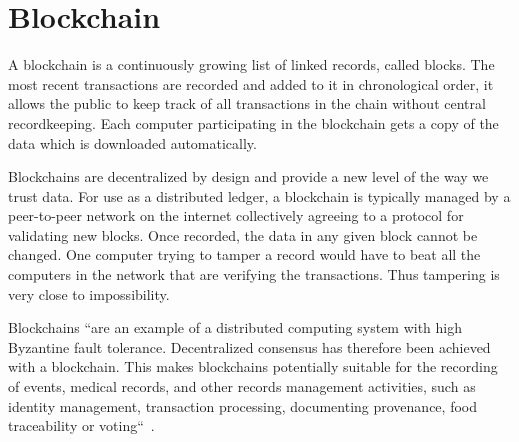 \section{Blockchain}

A blockchain is a continuously growing 
list of linked records, called
blocks. The most recent transactions 
are recorded and added to it in
chronological order, it allows the 
public to keep track of all
transactions in the chain without
central recordkeeping. Each computer
participating in the blockchain gets 
a copy of the data which is
downloaded automatically.

Blockchains are decentralized by 
design and provide a new level of the
way we trust data. For use as a 
distributed ledger, a blockchain is
typically managed by a peer-to-peer 
network on the internet
collectively agreeing to a protocol 
for validating new blocks. Once
recorded, the data in any given block 
cannot be changed. One computer
trying to tamper a record would 
have to beat all the computers in the
network that are verifying the 
transactions. Thus tampering is very
close to impossibility.

Blockchains ``are an example of 
a distributed computing system with
high Byzantine fault tolerance. 
Decentralized consensus has therefore
been achieved with a blockchain. 
This makes blockchains potentially
suitable for the recording of events, 
medical records, and other
records management activities, 
such as identity management,
transaction processing, documenting 
provenance, food traceability or
voting``~\cite{hid-sp18-506-Blockchain}.
